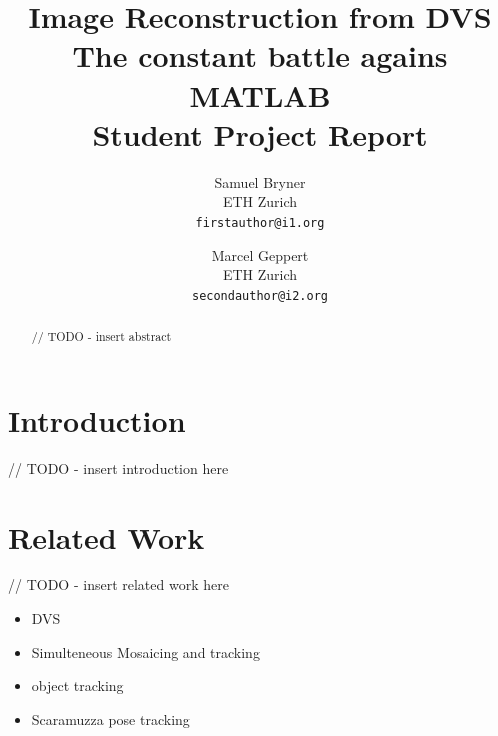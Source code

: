 \documentclass[10pt,twocolumn,letterpaper]{article}
\begin{document}
\title{Image Reconstruction from DVS\\ The constant battle agains MATLAB\\ Student Project Report}

\author{Samuel Bryner\\
ETH Zurich\\
{\tt\small firstauthor@i1.org}
\and
Marcel Geppert\\
ETH Zurich\\
{\tt\small secondauthor@i2.org}
}

\maketitle

\begin{abstract}

// TODO - insert abstract

\end{abstract}

\section{Introduction}

// TODO - insert introduction here

\section{Related Work}

// TODO - insert related work here

\begin{itemize}
\item DVS \cite{lpd08dvs}
\item Simulteneous Mosaicing and tracking \cite{kim2014simultaneous}
\item object tracking \cite{vmv.20141280}
\item Scaramuzza pose tracking \cite{mueggler2014event}
\end{itemize}
\end{document}
